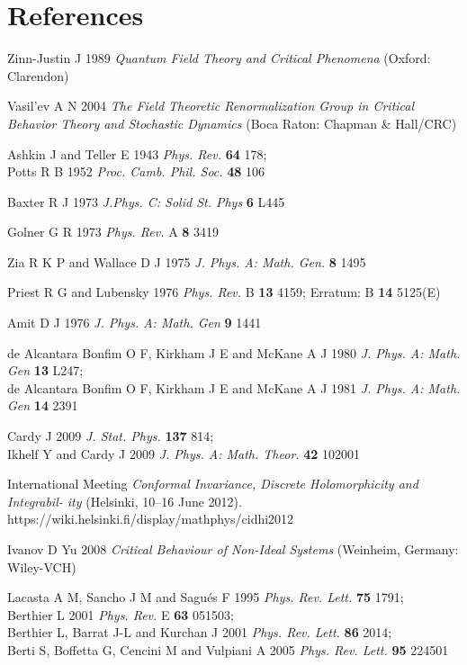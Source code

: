 \documentclass []{rusthesis} %
\begin{document}
\section*{References}
\begin{thebibliography}{99}

 Zinn-Justin J 1989 {\it Quantum Field Theory and Critical
Phenomena} (Oxford: Clarendon)

 Vasil'ev A N 2004 {\it The Field Theoretic Renormalization
Group in Critical Behavior Theory and Stochastic Dynamics}
(Boca Raton: Chapman \& Hall/CRC)

 Ashkin J and Teller E 1943 {\it Phys. Rev.}
{\bf 64} 178;\\
Potts R B 1952
{\it Proc. Camb. Phil. Soc.}
{\bf 48} 106

 Baxter R J 1973 {\it J.Phys. C: Solid St. Phys}
{\bf 6} L445

 Golner G R 1973 {\it Phys. Rev.} A
{\bf 8} 3419

 Zia R K P and Wallace D J 1975 {\it J. Phys. A: Math. Gen.}
{\bf 8} 1495

 Priest R G and Lubensky 1976 {\it Phys. Rev.} B
{\bf 13} 4159; Erratum: B {\bf 14} 5125(E)

 Amit D J 1976 {\it J. Phys. A: Math. Gen}
{\bf 9} 1441


de Alcantara Bonfim O F, Kirkham J E and McKane A J 1980
{\it J. Phys. A: Math. Gen}
{\bf 13} L247;\\
de Alcantara Bonfim O F, Kirkham J E and McKane A J 1981
{\it J. Phys. A: Math. Gen}
{\bf 14} 2391


Cardy J 2009
{\it J. Stat. Phys.}
{\bf 137} 814;\\
Ikhelf Y and Cardy J 2009
{\it J. Phys. A: Math. Theor.}
{\bf 42} 102001

International Meeting {\it Conformal Invariance, Discrete Holomorphicity and Integrabil-
ity } (Helsinki, 10–16 June 2012). https://wiki.helsinki.fi/display/mathphys/cidhi2012


Ivanov D Yu 2008 {\it Critical Behaviour of Non-Ideal Systems} (Weinheim, Germany: Wiley-VCH)

Lacasta A M, Sancho J M and Sagu\'{e}s F 1995
{\it Phys. Rev. Lett.} 
{\bf 75} 1791;\\
Berthier L 2001 
{\it Phys. Rev.} E 
{\bf 63} 051503;\\
Berthier L, Barrat J-L and Kurchan J 2001 
{\it Phys. Rev. Lett.}
{\bf 86} 2014;\\
Berti S, Boffetta G, Cencini M and Vulpiani A 2005 
{\it Phys. Rev. Lett.}
{\bf 95} 224501


\end{thebibliography}
\end{document}
